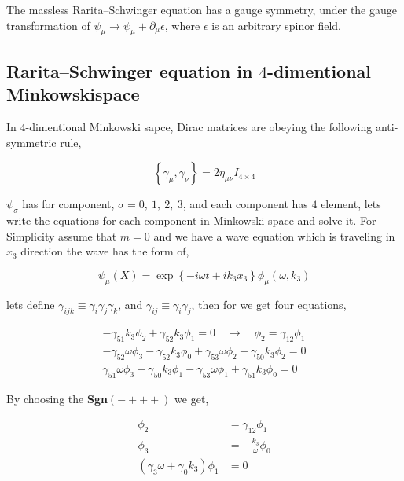 The massless Rarita–Schwinger equation has a gauge symmetry, under the gauge transformation of $\psi_{\mu} \rightarrow \psi_{\mu} + \partial_{\mu} \epsilon$, where $\mathcal{\epsilon}$ is an arbitrary spinor field.\\


\subsection{Rarita–Schwinger equation in $4$-dimentional Minkowskispace}

In $4$-dimentional Minkowski sapce, Dirac matrices are obeying the following anti-symmetric rule,

\begin{equation}
   \left\{\gamma_{\mu},\gamma_{\nu}\right\} = 2\eta_{\mu\nu} I_{4\times 4}
\end{equation}

$\psi_{\sigma}$ has for component, $\sigma = 0,~1,~2,~3$, and each component has $4$ element, lets write the equations for each component in Minkowski space and solve it. For Simplicity assume that $m=0$ and we have a wave equation which is traveling in $x_3$ direction the wave has the form of,

\begin{equation}
   \psi_{\mu}(X) = \exp\left\{-i\omega t+ik_3x_3 \right\} \phi_{\mu}(\omega,k_3)
\end{equation}

lets define $\gamma_{ijk}\equiv\gamma_{i}\gamma_{j}\gamma_{k}$, and $\gamma_{ij} \equiv \gamma_{i}\gamma_{j}$, then for we get four equations,

\begin{align}
   -\gamma_{51}k_3\phi_{2} + \gamma_{52}k_3\phi_{1} =0 \quad \rightarrow \quad \phi_{2} = \gamma_{12}\phi_{1}\nonumber\\
   -\gamma_{52}\omega\phi_{3} - \gamma_{52}k_3\phi_{0} + \gamma_{53}\omega\phi_{2} + \gamma_{50}k_3\phi_{2} =0 \nonumber\\
   \gamma_{51}\omega\phi_{3} - \gamma_{50}k_3\phi_{1} - \gamma_{53}\omega\phi_{1} + \gamma_{51}k_3\phi_{0} =0 
\end{align}

By choosing the \textbf{Sgn}$(-+++)$  we get,

\begin{align}
   \phi_{2} &= \gamma_{12}\phi_{1} \nonumber\\
   \phi_{3} &= -\frac{k_3}{\omega}\phi_{0} \nonumber\\
   (\gamma_{3}\omega + \gamma_{0}k_3)\phi_{1} &= 0
\end{align}

